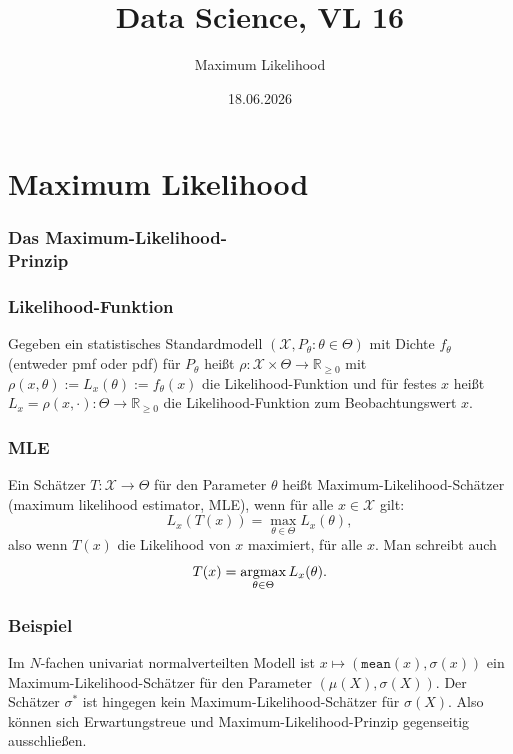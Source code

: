 

\title{Data Science, VL 16}
\subtitle{Maximum Likelihood}
\date{18.06.2026}



\begin{frame}
  \titlepage
\end{frame}

\section{Maximum Likelihood}

\begin{frame}[separator]
  \frametitle{Das Maximum-Likelihood-\\Prinzip}
\end{frame}
  
  
      \begin{frame}
    \frametitle{Likelihood-Funktion}
\begin{definition}
Gegeben ein statistisches Standardmodell $(\mathcal{X}, P_\theta : \theta \in \Theta)$ mit Dichte $f_\theta$ (entweder pmf oder pdf) für $P_\theta$ heißt $\rho \colon \mathcal{X} \times \Theta \to \mathbb{R}_{\geq 0}$ mit $\rho(x, \theta) := L_x(\theta) := f_\theta(x)$ die \alert{Likelihood-Funktion} und für festes $x$ heißt $L_x =\rho(x, \cdot) \colon \Theta \to \mathbb{R}_{\geq 0}$ die \alert{Likelihood}-Funktion zum Beobachtungswert $x$.
\end{definition}

  \end{frame}

  
      \begin{frame}
    \frametitle{MLE}
\begin{definition}
  Ein Schätzer $T \colon \mathcal{X} \to \Theta$ für den Parameter $\theta$ heißt \alert{Maximum-Likelihood-Schätzer} (maximum likelihood estimator, MLE), wenn für alle $x \in \mathcal{X}$ gilt:
\[L_x(T(x)) = \max_{\theta \in \Theta} L_x(\theta),\]
also wenn $T(x)$ die Likelihood von $x$ maximiert, für alle $x$. Man schreibt auch
\[T(x) = \operatorname*{argmax}_{\theta \in \Theta} L_x(\theta).\]
\end{definition}
\end{frame}

  
      \begin{frame}
    \frametitle{Beispiel}
Im $N$-fachen univariat normalverteilten Modell ist $x \mapsto (\texttt{mean}(x), \sigma(x))$ ein Maximum-Likelihood-Schätzer für den Parameter $(\mu(X), \sigma(X))$. Der Schätzer $\sigma^\ast$ ist hingegen kein Maximum-Likelihood-Schätzer für $\sigma(X)$. Also können sich Erwartungstreue und Maximum-Likelihood-Prinzip gegenseitig ausschließen.
  \end{frame}

